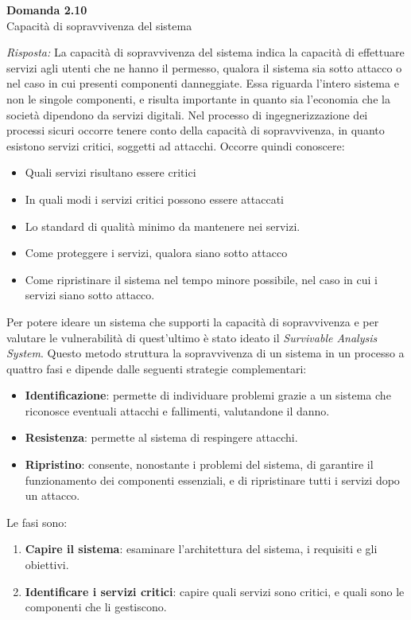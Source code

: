 \documentclass{article}
\newenvironment{problem}[2][Domanda]
    { \begin{mdframed}[backgroundcolor=gray!20] \textbf{#1 #2} \\}
    {  \end{mdframed}}
\newenvironment{solution}
    {\textit{Risposta:}}
    {}
\begin{document}
\begin{problem}{2.10}
Capacità di sopravvivenza del sistema
\end{problem}
\begin{solution}
La capacità di sopravvivenza del sistema indica la capacità di effettuare servizi agli utenti che ne hanno il permesso, qualora il sistema sia sotto attacco o nel caso in cui presenti componenti danneggiate.
Essa riguarda l'intero sistema e non le singole componenti, e risulta importante in quanto sia l'economia che la società dipendono da servizi digitali.
Nel processo di ingegnerizzazione dei processi sicuri occorre tenere conto della capacità di sopravvivenza, in quanto esistono servizi critici, soggetti ad attacchi.
Occorre quindi conoscere:
\begin{itemize}
	\item Quali servizi risultano essere critici
	\item In quali modi i servizi critici possono essere attaccati
	\item Lo standard di qualità minimo da mantenere nei servizi.
	\item Come proteggere i servizi, qualora siano sotto attacco
	\item Come ripristinare il sistema nel tempo minore possibile, nel caso in cui i servizi siano sotto attacco.
\end{itemize}
Per potere ideare un sistema che supporti la capacità di sopravvivenza e per valutare le vulnerabilità di quest'ultimo è stato ideato il \textit{Survivable Analysis System}.
Questo metodo struttura la sopravvivenza di un sistema in un processo a quattro fasi e dipende dalle seguenti strategie complementari:
\begin{itemize}
	\item \textbf{Identificazione}: permette di individuare problemi grazie a un sistema che riconosce eventuali attacchi e fallimenti, valutandone il danno.
	\item \textbf{Resistenza}: permette al sistema di respingere attacchi.
	\item \textbf{Ripristino}: consente, nonostante i problemi del sistema, di garantire il funzionamento dei componenti essenziali, e di ripristinare tutti i servizi dopo un attacco.
\end{itemize}
Le fasi sono:
\begin{enumerate}
	\item \textbf{Capire il sistema}: esaminare l'architettura del sistema, i requisiti e gli obiettivi.
	\item \textbf{Identificare i servizi critici}: capire quali servizi sono critici, e quali sono le componenti che li gestiscono.

\end{enumerate}
\end{solution}
\end{document}

